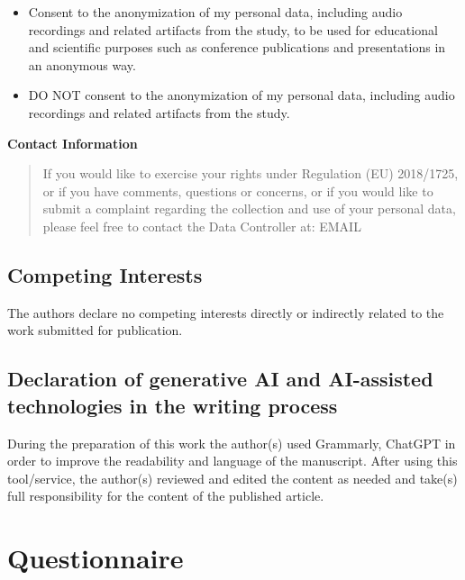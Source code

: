 \documentclass[
  11pt,
]{article}
\providecommand{\tightlist}{%
  \setlength{\itemsep}{0pt}\setlength{\parskip}{0pt}}
\begin{document}
\begin{itemize}
\tightlist
\item[$\square$]
  Consent to the anonymization of my personal data, including audio recordings and related artifacts from the study, to be used for educational and scientific purposes such as conference publications and presentations in an anonymous way.
\item[$\square$]
  DO NOT consent to the anonymization of my personal data, including audio recordings and related artifacts from the study.
\end{itemize}

\textbf{Contact Information}

\begin{quote}
If you would like to exercise your rights under Regulation (EU) 2018/1725, or if you have comments, questions or concerns, or if you would like to submit a complaint regarding the collection and use of your personal data, please feel free to contact the Data Controller at: EMAIL
\end{quote}

\subsection{Competing Interests}\label{competing-interests}

The authors declare no competing interests directly or indirectly related to the work submitted for publication.

\subsection{Declaration of generative AI and AI-assisted technologies in the writing process}\label{declaration-of-generative-ai-and-ai-assisted-technologies-in-the-writing-process}

During the preparation of this work the author(s) used Grammarly, ChatGPT in order to improve the readability and language of the manuscript. After using this tool/service, the author(s) reviewed and edited the content as needed and take(s) full responsibility for the content of the published article.

\newpage

\section{Questionnaire}\label{questionnaire}
\end{document}
